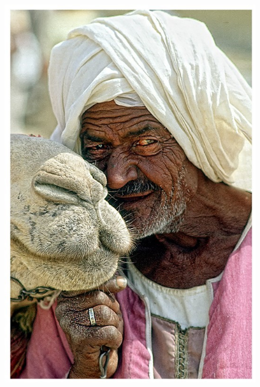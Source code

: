 \begin{figure}[htb] \centering
\includegraphics[scale=4]{Pictures/analogico_originale.jpg}
\qquad\qquad

\end{figure}
